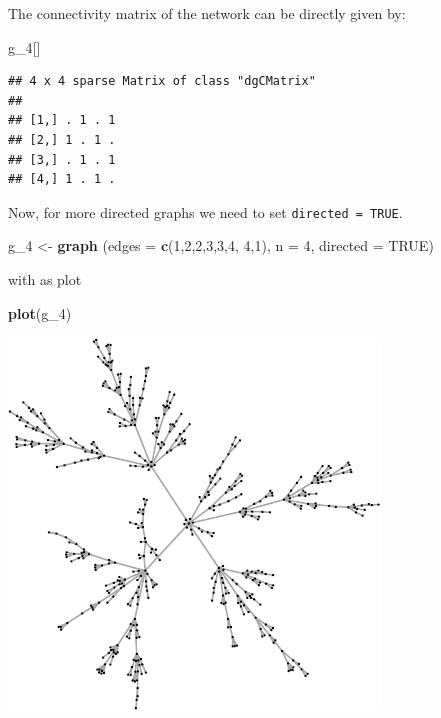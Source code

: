 \documentclass[]{article}
\newenvironment{Shaded}{\begin{snugshade}}{\end{snugshade}}
\newcommand{\KeywordTok}[1]{\textcolor[rgb]{0.13,0.29,0.53}{\textbf{#1}}}
\newcommand{\DataTypeTok}[1]{\textcolor[rgb]{0.13,0.29,0.53}{#1}}
\newcommand{\DecValTok}[1]{\textcolor[rgb]{0.00,0.00,0.81}{#1}}
\newcommand{\StringTok}[1]{\textcolor[rgb]{0.31,0.60,0.02}{#1}}
\newcommand{\OtherTok}[1]{\textcolor[rgb]{0.56,0.35,0.01}{#1}}
\newcommand{\NormalTok}[1]{#1}
\theoremstyle{definition}
\theoremstyle{definition}
\theoremstyle{definition}
\theoremstyle{remark}
\begin{document}
The connectivity matrix of the network can be directly given by:

\begin{Shaded}
\begin{Highlighting}[]
\NormalTok{g_}\DecValTok{4}\NormalTok{[]}
\end{Highlighting}
\end{Shaded}

\begin{verbatim}
## 4 x 4 sparse Matrix of class "dgCMatrix"
##             
## [1,] . 1 . 1
## [2,] 1 . 1 .
## [3,] . 1 . 1
## [4,] 1 . 1 .
\end{verbatim}

Now, for more directed graphs we need to set \texttt{directed\ =\ TRUE}.

\begin{Shaded}
\begin{Highlighting}[]
\NormalTok{g_}\DecValTok{4}\NormalTok{ <-}\StringTok{ }\KeywordTok{graph}\NormalTok{ (}\DataTypeTok{edges =} \KeywordTok{c}\NormalTok{(}\DecValTok{1}\NormalTok{,}\DecValTok{2}\NormalTok{,}\DecValTok{2}\NormalTok{,}\DecValTok{3}\NormalTok{,}\DecValTok{3}\NormalTok{,}\DecValTok{4}\NormalTok{, }\DecValTok{4}\NormalTok{,}\DecValTok{1}\NormalTok{), }\DataTypeTok{n =} \DecValTok{4}\NormalTok{, }\DataTypeTok{directed =} \OtherTok{TRUE}\NormalTok{)}
\end{Highlighting}
\end{Shaded}

with as plot

\begin{Shaded}
\begin{Highlighting}[]
\KeywordTok{plot}\NormalTok{(g_}\DecValTok{4}\NormalTok{)}
\end{Highlighting}
\end{Shaded}

\includegraphics{ResearchTools_files/figure-latex/unnamed-chunk-56-1.pdf}
\end{document}
